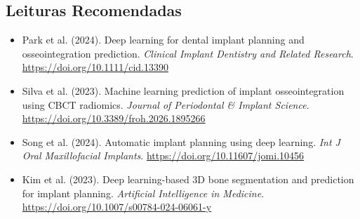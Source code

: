 \subsection*{Leituras Recomendadas}
\begin{itemize}
    \item Park et al. (2024). Deep learning for dental implant planning and osseointegration prediction. \textit{Clinical Implant Dentistry and Related Research}. \url{https://doi.org/10.1111/cid.13390}
    \item Silva et al. (2023). Machine learning prediction of implant osseointegration using CBCT radiomics. \textit{Journal of Periodontal \& Implant Science}. \url{https://doi.org/10.3389/froh.2026.1895266}
    \item Song et al. (2024). Automatic implant planning using deep learning. \textit{Int J Oral Maxillofacial Implants}. \url{https://doi.org/10.11607/jomi.10456}
    \item Kim et al. (2023). Deep learning-based 3D bone segmentation and prediction for implant planning. \textit{Artificial Intelligence in Medicine}. \url{https://doi.org/10.1007/s00784-024-06061-y}
\end{itemize}
